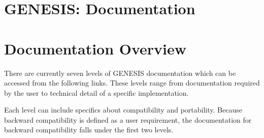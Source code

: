 \documentclass[12pt]{article}
\begin{document}
\section*{GENESIS: Documentation}

\section*{Documentation Overview}

There are currently seven levels of GENESIS documentation which can be
accessed from the following links.  These levels range from documentation required by the user to technical detail of a specific implementation.

Each level can include specifics about compatibility and
portability.  Because backward compatibility is
defined as a user requirement, the documentation for backward
compatibility falls under the first two levels.
\end{document}
